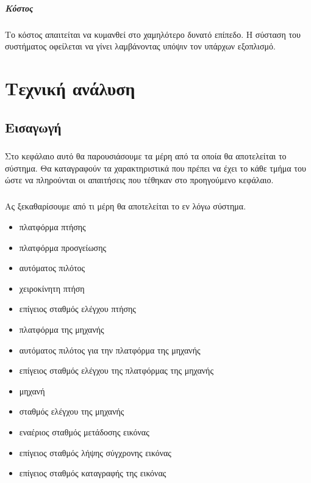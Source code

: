 \documentclass[a4paper, 12pt, twoside]{report}
\begin{document}
{{{{{ 			\paragraph{Κόστος}{Το κόστος απαιτείται να κυμανθεί στο χαμηλότερο δυνατό επίπεδο. Η σύσταση του συστήματος οφείλεται να γίνει λαμβάνοντας υπόψιν τον υπάρχων εξοπλισμό.
 			
 	\chapter{Τεχνική ανάλυση}
		\section{Εισαγωγή}
			\paragraph{}{Στο κεφάλαιο αυτό θα παρουσιάσουμε τα μέρη από τα οποία θα αποτελείται το σύστημα. Θα καταγραφούν τα χαρακτηριστικά που πρέπει να έχει το κάθε τμήμα του ώστε να πληρούνται οι απαιτήσεις που τέθηκαν στο προηγούμενο κεφάλαιο.
			}
			
			\paragraph{}{Ας ξεκαθαρίσουμε από τι μέρη θα αποτελείται το εν λόγω σύστημα.
			\begin{itemize}
				\item πλατφόρμα πτήσης
				\item πλατφόρμα προσγείωσης
				\item αυτόματος πιλότος
				\item χειροκίνητη πτήση
				\item επίγειος σταθμός ελέγχου πτήσης
				\item πλατφόρμα της μηχανής
				\item αυτόματος πιλότος για την πλατφόρμα της μηχανής
				\item επίγειος σταθμός ελέγχου της πλατφόρμας της μηχανής
				\item μηχανή
				\item σταθμός ελέγχου της μηχανής
				\item εναέριος σταθμός μετάδοσης εικόνας
				\item επίγειος σταθμός λήψης σύγχρονης εικόνας
				\item επίγειος σταθμός καταγραφής της εικόνας
			\end{itemize}
			}
		
}}}}}}
\end{document}
